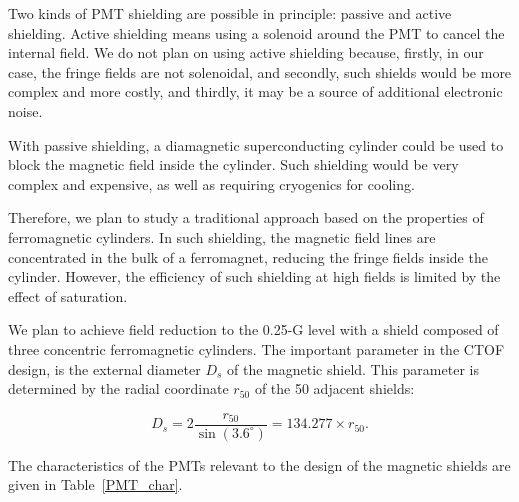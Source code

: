 Two kinds of PMT shielding are possible in principle: passive and active shielding. 
Active shielding means using a solenoid around the PMT to cancel the internal field.  
We do not plan on using active shielding because, firstly, in our case, the fringe  
fields are not solenoidal, and secondly, such shields would be more complex and more 
costly, and thirdly, it may be a source of additional electronic noise.

With passive shielding, a diamagnetic superconducting cylinder could be used to 
block the magnetic field inside the cylinder.  Such shielding would be very complex 
and expensive, as well as requiring cryogenics for cooling.

Therefore, we plan to study a traditional approach based on the properties of 
ferromagnetic cylinders.  In such shielding, the magnetic field lines are 
concentrated in the bulk of a ferromagnet, reducing the fringe fields inside the 
cylinder.  However, the efficiency of such shielding at high fields is limited by 
the effect of saturation.

We plan to achieve field reduction to the 0.25-G level with a shield composed of 
three concentric ferromagnetic cylinders.  The important parameter in the CTOF 
design, is the external diameter $D_{s}$ of the magnetic shield.  This parameter
is determined by the radial coordinate $r_{50}$ of the 50 adjacent shields:

\begin{equation}
\label{dsmax}
D_{s} = 2\frac{r_{50}}{\sin(3.6^\circ)} = 134.277 \times r_{50}.
\end{equation}

The characteristics of the PMTs relevant to the design of the magnetic shields
are given in Table~\ref{PMT_char}.

